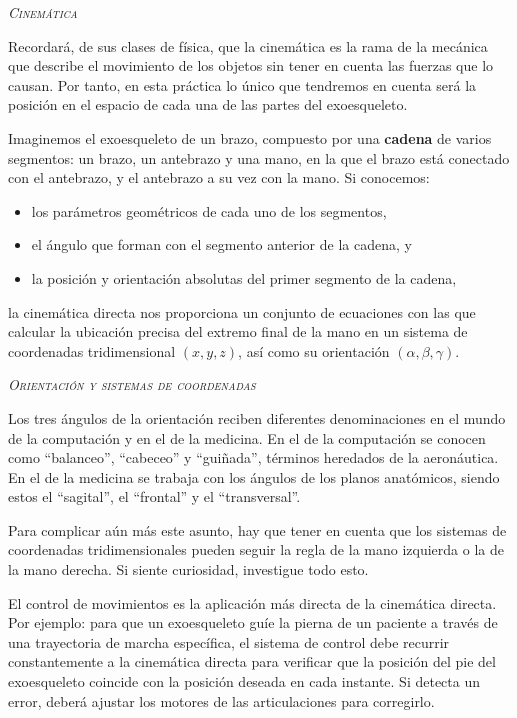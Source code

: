 \documentclass[10pt,a4paper,spanish]{article}
\newcommand{\sombreado}[2]{
  \begin{shaded}
    \begin{center} \emph{\textsc{#1}} \end{center}
    \noindent #2\\
  \end{shaded}
}
\begin{document}
\sombreado{Cinemática}{Recordará, de sus clases de física, que la cinemática es la rama de la mecánica que describe el movimiento de los objetos sin tener en cuenta las fuerzas que lo causan. Por tanto, en esta práctica lo único que tendremos en cuenta será la posición en el espacio de cada una de las partes del exoesqueleto.}

Imaginemos el exoesqueleto de un brazo, compuesto por una \textbf{cadena} de varios segmentos: un brazo, un antebrazo y una mano, en la que el brazo está conectado con el antebrazo, y el antebrazo a su vez con la mano. Si conocemos:

\begin{itemize}
    \item los parámetros geométricos de cada uno de los segmentos,
    \item el ángulo que forman con el segmento anterior de la cadena, y
    \item la posición y orientación absolutas del primer segmento de la cadena,
\end{itemize}

la cinemática directa nos proporciona un conjunto de ecuaciones con las que calcular la ubicación precisa del extremo final de la mano en un sistema de coordenadas tridimensional $(x, y, z)$, así como su orientación $(\alpha, \beta, \gamma)$.

\sombreado{Orientación y sistemas de coordenadas}{Los tres ángulos de la orientación reciben diferentes denominaciones en el mundo de la computación y en el de la medicina. En el de la computación se conocen como ``balanceo'', ``cabeceo'' y ``guiñada'', términos heredados de la aeronáutica. En el de la medicina se trabaja con los ángulos de los planos anatómicos, siendo estos el ``sagital'', el ``frontal'' y el ``transversal''.

Para complicar aún más este asunto, hay que tener en cuenta que los sistemas de coordenadas tridimensionales pueden seguir la regla de la mano izquierda o la de la mano derecha. Si siente curiosidad, investigue todo esto.}

El control de movimientos es la aplicación más directa de la cinemática directa. Por ejemplo: para que un exoesqueleto guíe la pierna de un paciente a través de una trayectoria de marcha específica, el sistema de control debe recurrir constantemente a la cinemática directa para verificar que la posición del pie del exoesqueleto coincide con la posición deseada en cada instante. Si detecta un error, deberá ajustar los motores de las articulaciones para corregirlo.
\end{document}
